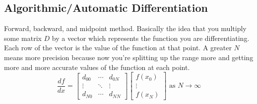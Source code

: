\documentclass{article}
\begin{document}
\subsection {Algorithmic/Automatic Differentiation}
Forward, backward, and midpoint method.
Basically the idea that you multiply some matrix $D$ by a vector which represents the function you are differentiating. Each row of the vector is the
value of the function at that point. A greater $N$ means more precision because now you're splitting up the range more and getting more and more accurate
values of the function at each point. 
$$
\dfrac{df}{dx} = 
\begin{bmatrix}
	d_{00} & \cdots & d_{0N} \\
	\vdots & \ddots & \vdots \\
	d_{N0} & \cdots & d_{NN}
\end{bmatrix}
\begin{bmatrix}
	f(x_0) \\
	\vdots \\
	f(x_N)
\end{bmatrix}
\text{ as } N \rightarrow \infty
$$
\end{document}
